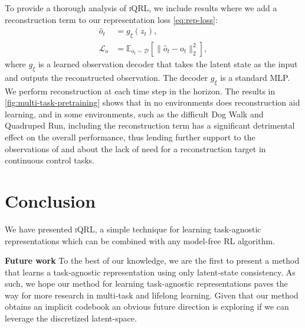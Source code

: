 \documentclass{article}
\theoremstyle{plain}
\theoremstyle{definition}
\theoremstyle{remark}
\newcommand{\our}{\textsc{iQRL}\xspace}
\begin{document}
To provide a thorough analysis of \our, we include results where we add a reconstruction term to our representation loss \cref{eq:rep-loss}:
\begin{align*}
	\hat{o}_t &= g_\xi(z_t), \\
	\mathcal{L}_o &= \mathbb{E}_{o_t\sim\mathcal{D}} [\| \hat{o}_t - o_t \|_2^2],
\end{align*}
where $g_\xi$ is a learned observation decoder that takes the latent state as the input and outputs the reconstructed observation. The decoder $g_\xi$ is a standard MLP. We perform reconstruction at each time step in the horizon.
The results in \cref{fig:multi-task-pretraining} shows that in no environments does reconstruction aid learning, and in some environments, such as the difficult Dog Walk and Quadruped Run, including the reconstruction term has a significant detrimental effect on the overall performance, thus lending further support to the observations of \citet{zhaoSimplifiedTemporalConsistency2023} and \citet{hansenTemporalDifferenceLearning2022} about the lack of need for a reconstruction target in continuous control tasks.









\section{Conclusion}
\label{conclusion}
We have presented \our, a simple technique for learning task-agnostic representations which can be combined with
any model-free RL algorithm.

\textbf{Future work}
To the best of our knowledge, we are the first to present a method that learns a task-agnostic representation
using only latent-state consistency. As such, we hope our method for learning task-agnostic representations paves the
way for more research in multi-task and lifelong learning.
Given that our method obtains an implicit codebook an obvious future direction is exploring if we can leverage the
discretized latent-space.
\end{document}
